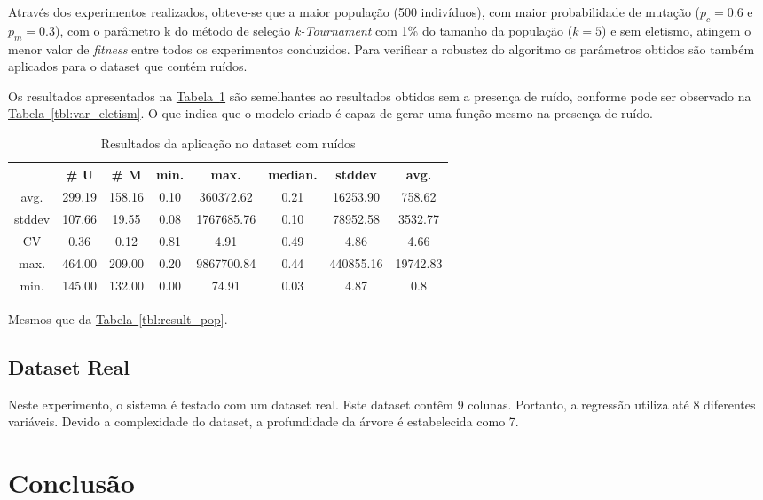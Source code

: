 \documentclass[a4paper]{paper}
\begin{document}
Através dos experimentos realizados, obteve-se que a maior população (500
indivíduos), com maior probabilidade de mutação ($p_c=0.6$ e $p_m=0.3$), com o
parâmetro k do método de seleção \textit{k-Tournament} com 1\% do tamanho da
população ($k=5$) e sem eletismo, atingem o menor valor de \textit{fitness}
entre todos os experimentos conduzidos. Para verificar a robustez do algoritmo
os parâmetros obtidos são também aplicados para o dataset que contém ruídos.

Os resultados apresentados na
\hyperref[tbl:noise_dataset]{Tabela~\ref*{tbl:noise_dataset}} são semelhantes ao
resultados obtidos sem a presença de ruído, conforme pode ser observado na
\hyperref[tbl:var_eletism]{Tabela~\ref*{tbl:var_eletism}}. O que indica que o
modelo criado é capaz de gerar uma função mesmo na presença de ruído.

\begin{table}
  \center
  \caption{Resultados da aplicação no dataset com ruídos}
  \label{tbl:noise_dataset}
  \begin{tabular}{| c | c | c | c | c | c | c | c |}
    \hline
    &  \# U & \# M & min. & max. & median. & stddev & avg. \\ \hline 
avg. & 299.19 & 158.16 & 0.10 & 360372.62 & 0.21 & 16253.90 & 758.62 \\ \hline 
stddev & 107.66 & 19.55 & 0.08 & 1767685.76 & 0.10 & 78952.58 & 3532.77 \\ \hline 
CV & 0.36 & 0.12 & 0.81 & 4.91 & 0.49 & 4.86 & 4.66 \\ \hline 
max. & 464.00 & 209.00 & 0.20 & 9867700.84 & 0.44 & 440855.16 & 19742.83 \\ \hline 
min. & 145.00 & 132.00 & 0.00 & 74.91 & 0.03 & 4.87 & 0.8 \\ \hline
  \end{tabular}
  \begin{minipage}{0.9\textwidth}
    {\footnotesize
      Mesmos que da \hyperref[tbl:result_pop]{Tabela~\ref*{tbl:result_pop}}.
    }
  \end{minipage}
\end{table}

\subsection{Dataset Real}
Neste experimento, o sistema é testado com um dataset real. Este dataset contêm
9 colunas. Portanto, a regressão utiliza até 8 diferentes variáveis. Devido a
complexidade do dataset, a profundidade da árvore é estabelecida como 7.


\section{Conclusão}


\citet*{poli2008}


\end{document}

